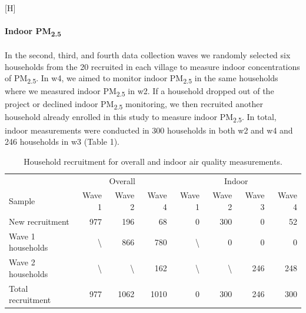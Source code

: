 \documentclass[
  letterpaper,
  DIV=11,
  numbers=noendperiod]{scrartcl}
\makeatletter
\let\oldparagraph\paragraph
\renewcommand{\paragraph}[1]{\oldparagraph{#1}\mbox{}}
\renewenvironment{figure}%
   {\renewcommand\familydefault\sfdefault
    \@float{figure}}
   {\end@float}
\makeatother
\begin{document}
\begin{figure}[H]


\caption{\label{fig-calibration}Calibration of real-time sensors against
a reference monitor at University of the Chinese Academy of Sciences.}

\end{figure}%

\paragraph{\texorpdfstring{Indoor
PM\textsubscript{2.5}}{Indoor PM2.5}}\label{indoor-pm2.5}

In the second, third, and fourth data collection waves we randomly
selected six households from the 20 recruited in each village to measure
indoor concentrations of PM\textsubscript{2.5}. In w4, we aimed to
monitor indoor PM\textsubscript{2.5} in the same households where we
measured indoor PM\textsubscript{2.5} in w2. If a household dropped out
of the project or declined indoor PM\textsubscript{2.5} monitoring, we
then recruited another household already enrolled in this study to
measure indoor PM\textsubscript{2.5}. In total, indoor measurements were
conducted in 300 households in both w2 and w4 and 246 households in w3
(Table 1).

\begin{longtable}[t]{lrrrrrrr}
\caption{\label{tab:tab-pm-sample}Household recruitment for overall and indoor air quality measurements.}\\
\toprule
\multicolumn{1}{c}{ } & \multicolumn{3}{c}{Overall} & \multicolumn{4}{c}{Indoor} \\
\cmidrule(l{3pt}r{3pt}){2-4} \cmidrule(l{3pt}r{3pt}){5-8}
Sample & Wave 1 & Wave 2 & Wave 4 & Wave 1 & Wave 2 & Wave 3 & Wave 4\\
\midrule
New recruitment & 977 & 196 & 68 & 0 & 300 & 0 & 52\\
Wave 1 households & \textbackslash{} & 866 & 780 & \textbackslash{} & 0 & 0 & 0\\
Wave 2 households & \textbackslash{} & \textbackslash{} & 162 & \textbackslash{} & \textbackslash{} & 246 & 248\\
Total recruitment & 977 & 1062 & 1010 & 0 & 300 & 246 & 300\\
\bottomrule
\end{longtable}
\end{document}
